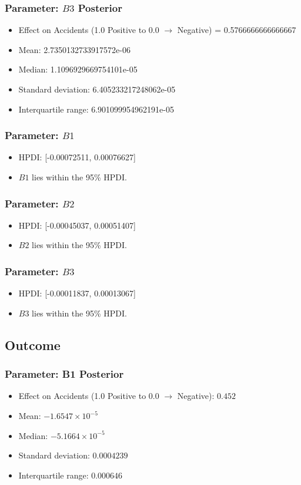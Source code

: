 \documentclass{article}
\begin{document}
\subsubsection*{Parameter: \(B3\) Posterior}
\begin{itemize}
    \item Effect on Accidents (1.0 Positive to 0.0 $\rightarrow$ Negative) = 0.5766666666666667
    \item Mean: 2.7350132733917572e-06
    \item Median: 1.1096929669754101e-05
    \item Standard deviation: 6.405233217248062e-05
    \item Interquartile range: 6.901099954962191e-05
\end{itemize}

\subsubsection*{Parameter: \(B1\)}
\begin{itemize}
    \item HPDI: [-0.00072511, 0.00076627]
    \item \(B1\) lies within the 95\% HPDI.
\end{itemize}

\subsubsection*{Parameter: \(B2\)}
\begin{itemize}
    \item HPDI: [-0.00045037, 0.00051407]
    \item \(B2\) lies within the 95\% HPDI.
\end{itemize}

\subsubsection*{Parameter: \(B3\)}
\begin{itemize}
    \item HPDI: [-0.00011837, 0.00013067]
    \item \(B3\) lies within the 95\% HPDI.
\end{itemize}

\subsection{Outcome}

\subsubsection{Parameter: B1 Posterior}
\begin{itemize}
    \item Effect on Accidents (1.0 Positive to 0.0 $\rightarrow$ Negative): $0.452$
    \item Mean: $-1.6547 \times 10^{-5}$
    \item Median: $-5.1664 \times 10^{-5}$
    \item Standard deviation: $0.0004239$
    \item Interquartile range: $0.000646$
\end{itemize}
\end{document}
